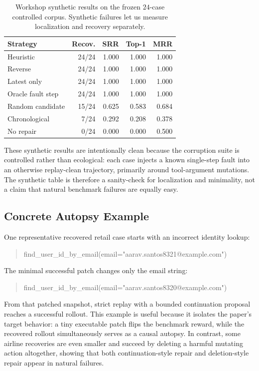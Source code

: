 \documentclass[11pt]{article}
\begin{document}
\begin{table}[t]
\centering
\small
\begin{tabular}{lrrrr}
\toprule
Strategy & Recov. & SRR & Top-1 & MRR \\
\midrule
Heuristic & 24/24 & 1.000 & 1.000 & 1.000 \\
Reverse & 24/24 & 1.000 & 1.000 & 1.000 \\
Latest only & 24/24 & 1.000 & 1.000 & 1.000 \\
Oracle fault step & 24/24 & 1.000 & 1.000 & 1.000 \\
Random candidate & 15/24 & 0.625 & 0.583 & 0.684 \\
Chronological & 7/24 & 0.292 & 0.208 & 0.378 \\
No repair & 0/24 & 0.000 & 0.000 & 0.500 \\
\bottomrule
\end{tabular}
\caption{Workshop synthetic results on the frozen $24$-case controlled corpus.
Synthetic failures let us measure localization and recovery separately.}
\label{tab:workshop_synthetic_results}
\end{table}

These synthetic results are intentionally clean because the corruption suite is
controlled rather than ecological: each case injects a known single-step fault
into an otherwise replay-clean trajectory, primarily around tool-argument
mutations. The synthetic table is therefore a sanity-check for localization and
minimality, not a claim that natural benchmark failures are equally easy.

\subsection*{Concrete Autopsy Example}

One representative recovered retail case starts with an incorrect identity
lookup:
\begin{quote}
\small\ttfamily
find\_user\_id\_by\_email(email="aarav.santos8321@example.com")
\end{quote}
The minimal successful patch changes only the email string:
\begin{quote}
\small\ttfamily
find\_user\_id\_by\_email(email="aarav.santos8320@example.com")
\end{quote}
From that patched snapshot, strict replay with a bounded continuation proposal
reaches a successful rollout. This example is useful because it isolates the
paper's target behavior: a tiny executable patch flips the benchmark reward,
while the recovered rollout simultaneously serves as a causal autopsy. In
contrast, some airline recoveries are even smaller and succeed by deleting a
harmful mutating action altogether, showing that both continuation-style repair
and deletion-style repair appear in natural failures.
\end{document}
